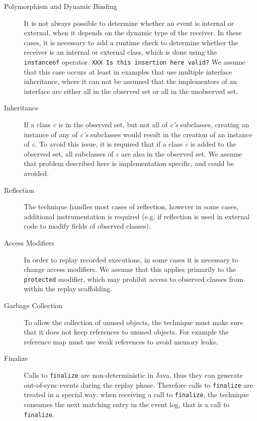 \begin{description}
 \item [Polymorphism and Dynamic Binding] It is not always possible to determine whether an event is internal or external, when it depends on the dynamic type of the receiver. In these cases, it is necessary to add a runtime check to determine whether the receiver is an internal or external class, which is done using the \texttt{instanceof} operator. \texttt{XXX Is this insertion here valid?} We assume that this case occurs at least in examples that use multiple interface inheritance, where it can not be assumed that the implementors of an interface are either all in the observed set or all in the unobserved set.
 \item [Inheritance] If a class \emph{c} is in the observed set, but not all of \emph{c's} subclasses, creating an instance of any of \emph{c's} subclasses would result in the creation of an instance of \emph{c}. To avoid this issue, it is required that if a class \emph{c} is added to the observed set, all subclasses of \emph{c} are also in the observed set. We assume that problem described here is implementation specific, and could be avoided.
 \item [Reflection] The technique handles most cases of reflection, however in some cases, additional instrumentation is required (e.g. if reflection is used in external code to modify fields of observed classes). 
 \item [Access Modifiers] In order to replay recorded executions, in some cases it is necessary to change access modifiers. We assume that this applies primarily to the \texttt{protected} modifier, which may prohibit access to observed classes from within the replay scaffolding.
 \item [Garbage Collection] To allow the collection of unused objects, the technique must make sure that it does not keep references to unused objects. For example the reference map must use weak references to avoid memory leaks.
 \item [Finalize] Calls to \texttt{finalize} are non-deterministic in Java, thus they can generate out-of-sync events during the replay phase. Therefore calls to \texttt{finalize} are treated in a special way: when receiving a call to \texttt{finalize}, the technique consumes the next matching entry in the event log, that is a call to \texttt{finalize}.
\end{description}
